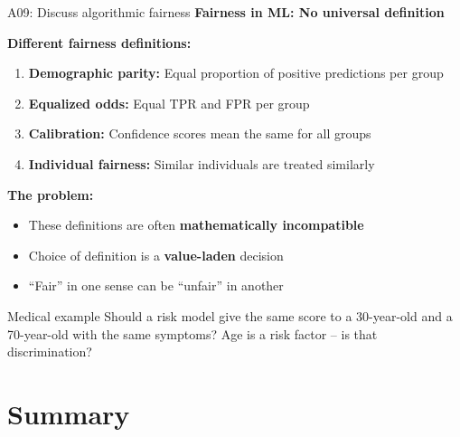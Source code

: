 \documentclass[aspectratio=169, 10pt]{beamer}
\begin{document}
\begin{frame}{A09: Discuss algorithmic fairness}
    \textbf{Fairness in ML: No universal definition}
    
    \vspace{0.3cm}
    \textbf{Different fairness definitions:}
    \begin{enumerate}
        \item \textbf{Demographic parity:} Equal proportion of positive predictions per group
        \item \textbf{Equalized odds:} Equal TPR and FPR per group
        \item \textbf{Calibration:} Confidence scores mean the same for all groups
        \item \textbf{Individual fairness:} Similar individuals are treated similarly
    \end{enumerate}
    
    \vspace{0.3cm}
    \textbf{The problem:}
    \begin{itemize}
        \item These definitions are often \textbf{mathematically incompatible}
        \item Choice of definition is a \textbf{value-laden} decision
        \item ``Fair'' in one sense can be ``unfair'' in another
    \end{itemize}
    
    \vspace{0.3cm}
    \begin{block}{Medical example}
        Should a risk model give the same score to a 30-year-old and a 70-year-old with the same symptoms? Age is a risk factor -- is that discrimination?
    \end{block}
\end{frame}

\section*{Summary}
\end{document}
